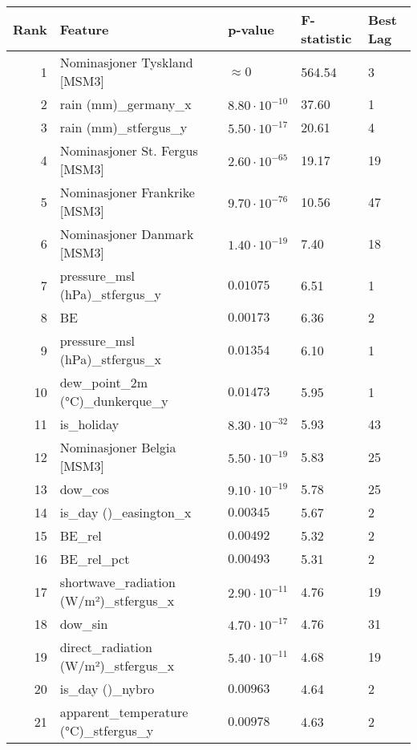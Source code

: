 \begin{table}[H]
    \centering
    \small
    \begin{tabular}{r l l l l}
        \hline
        \textbf{Rank} & \textbf{Feature} & \textbf{p-value} & \textbf{F-statistic} & \textbf{Best Lag} \\
        \hline
        1 & Nominasjoner Tyskland [MSM3] & $\approx 0$ & 564.54 & 3 \\
        2 & rain (mm)\_germany\_x & $8.80 \cdot 10^{-10}$ & 37.60 & 1 \\
        3 & rain (mm)\_stfergus\_y & $5.50 \cdot 10^{-17}$ & 20.61 & 4 \\
        4 & Nominasjoner St. Fergus [MSM3] & $2.60 \cdot 10^{-65}$ & 19.17 & 19 \\
        5 & Nominasjoner Frankrike [MSM3] & $9.70 \cdot 10^{-76}$ & 10.56 & 47 \\
        6 & Nominasjoner Danmark [MSM3] & $1.40 \cdot 10^{-19}$ & 7.40 & 18 \\
        7 & pressure\_msl (hPa)\_stfergus\_y & $0.01075$ & 6.51 & 1 \\
        8 & BE & $0.00173$ & 6.36 & 2 \\
        9 & pressure\_msl (hPa)\_stfergus\_x & $0.01354$ & 6.10 & 1 \\
        10 & dew\_point\_2m (°C)\_dunkerque\_y & $0.01473$ & 5.95 & 1 \\
        11 & is\_holiday & $8.30 \cdot 10^{-32}$ & 5.93 & 43 \\
        12 & Nominasjoner Belgia [MSM3] & $5.50 \cdot 10^{-19}$ & 5.83 & 25 \\
        13 & dow\_cos & $9.10 \cdot 10^{-19}$ & 5.78 & 25 \\
        14 & is\_day ()\_easington\_x & $0.00345$ & 5.67 & 2 \\
        15 & BE\_rel & $0.00492$ & 5.32 & 2 \\
        16 & BE\_rel\_pct & $0.00493$ & 5.31 & 2 \\
        17 & shortwave\_radiation (W/m²)\_stfergus\_x & $2.90 \cdot 10^{-11}$ & 4.76 & 19 \\
        18 & dow\_sin & $4.70 \cdot 10^{-17}$ & 4.76 & 31 \\
        19 & direct\_radiation (W/m²)\_stfergus\_x & $5.40 \cdot 10^{-11}$ & 4.68 & 19 \\
        20 & is\_day ()\_nybro & $0.00963$ & 4.64 & 2 \\
        21 & apparent\_temperature (°C)\_stfergus\_y & $0.00978$ & 4.63 & 2 \\

\end{tabular}
\end{table}
